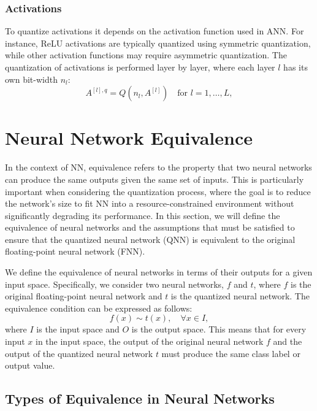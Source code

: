 \subsubsection*{Activations}

To quantize activations it depends on the activation function used in ANN. For instance, ReLU activations are typically quantized using symmetric quantization, while other activation functions may require asymmetric quantization. The quantization of activations is performed layer by layer, where each layer $l$ has its own bit-width $n_l$:
\begin{equation}
A^{[l],q} = Q(n_l, A^{[l]}) \quad \text{for } l = 1, \dots, L,
\end{equation}



\section{Neural Network Equivalence}

In the context of NN, equivalence refers to the property that two neural networks can produce the same outputs given the same set of inputs. This is particularly important when considering the quantization process, where the goal is to reduce the network's size to fit NN into a resource-constrained environment without significantly degrading its performance.
In this section, we will define the equivalence of neural networks and the assumptions that must be satisfied to ensure that the quantized neural network (QNN) is equivalent to the original floating-point neural network (FNN).

We define the equivalence of neural networks in terms of their outputs for a given input space. Specifically, we consider two neural networks, $f$ and $t$, where $f$ is the original floating-point neural network and $t$ is the quantized neural network. The equivalence condition can be expressed as follows:
\begin{equation}
f(x) \sim t(x), \quad \forall x \in I,
\end{equation}
where $I$ is the input space and $O$ is the output space. This means that for every input $x$ in the input space, the output of the original neural network $f$ and the output of the quantized neural network $t$ must produce the same class label or output value.

\subsection{Types of Equivalence in Neural Networks}

